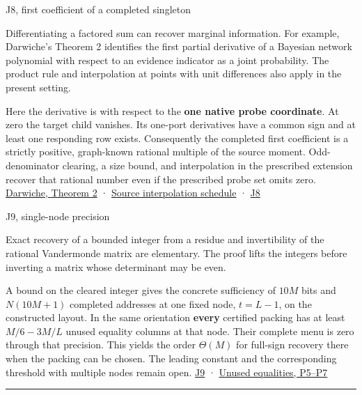 \documentclass[11pt,a4paper]{article}
\newlength{\OfflineResearchTableWidth}
\newcommand{\OfflineResearchHeaderRule}{\noindent\rule{\linewidth}{0.45pt}\par}
\newcommand{\OfflineResearchRow}{\par}
\newenvironment{OfflineResearchTable}{%
  \par\medskip\begingroup\small\setlength{\parindent}{0pt}%
  \setlength{\parskip}{3pt plus 1pt minus .5pt}%
  \setlength{\OfflineResearchTableWidth}{\linewidth}%
}{%
  \par\endgroup\medskip%
}
\begin{document}
\begin{OfflineResearchTable}
\begin{minipage}[t]{0.31500\OfflineResearchTableWidth}
J8, first coefficient of a completed singleton
\end{minipage}\hfill%
\begin{minipage}[t]{0.31500\OfflineResearchTableWidth}\raggedright
Differentiating a
factored sum can recover marginal information. For example, Darwiche's
Theorem 2 identifies the first partial derivative of a Bayesian network
polynomial with respect to an evidence indicator as a joint probability.
The product rule and interpolation at points with unit differences also
apply in the present setting.
\end{minipage}\hfill%
\begin{minipage}[t]{0.31500\OfflineResearchTableWidth}\raggedright
Here the derivative is with respect to
the \textbf{one native probe coordinate}. At zero the target child
vanishes. Its one-port derivatives have a common sign and at least one
responding row exists. Consequently the completed first coefficient is a
strictly positive, graph-known rational multiple of the source moment.
Odd-denominator clearing, a size bound, and interpolation in the
prescribed extension recover that rational number even if the prescribed
probe set omits zero.
\href{https://people.cs.pitt.edu/~milos/courses/cs3710/readings/differential-darwiche.pdf}{Darwiche,
Theorem 2} ·
\href{https://github.com/openai/math/blob/main/preprints/The-Exponential-Time-Hypothesis-is-False-October-25-2026/build/quantitative-contraction.tex\#L338}{Source
interpolation schedule} ·
\hyperref[v9-j8-polynomially-many-completed-full-input-probes]{J8}
\end{minipage}%
\OfflineResearchRow
\noindent%
\begin{minipage}[t]{0.31500\OfflineResearchTableWidth}\raggedright
J9, single-node precision
\end{minipage}\hfill%
\begin{minipage}[t]{0.31500\OfflineResearchTableWidth}\raggedright
Exact recovery of a bounded integer from a
residue and invertibility of the rational Vandermonde matrix are
elementary. The proof lifts the integers before inverting a matrix whose
determinant may be even.
\end{minipage}\hfill%
\begin{minipage}[t]{0.31500\OfflineResearchTableWidth}\raggedright
A bound on the cleared integer gives the
concrete sufficiency of \(10M\) bits and \(N(10M+1)\) completed
addresses at one fixed node, \(t=L-1\), on the constructed layout. In
the same orientation \textbf{every} certified packing has at least
\(M/6-3M/L\) unused equality columns at that node. Their complete menu
is zero through that precision. This yields the order \(\Theta(M)\) for
full-sign recovery there when the packing can be chosen. The leading
constant and the corresponding threshold with multiple nodes remain
open. \hyperref[v9-j9-the-single-node-precision-order-is-linear]{J9} ·
\hyperref[v9-what-unused-equality-columns-force]{Unused equalities,
P5--P7}
\end{minipage}%
\OfflineResearchRow
\OfflineResearchHeaderRule
\end{OfflineResearchTable}
\end{document}
